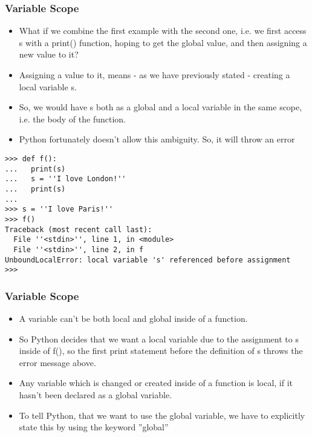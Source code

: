 \begin{frame}[fragile]\frametitle{Variable Scope}

    \begin{itemize}
    \item What if we combine the first example with the second one, i.e. we first access s with a print() function, hoping to get the global value, and then assigning a new value to it? 
    \item Assigning a value to it, means - as we have previously stated - creating a local variable s. 
    \item So, we would have s both as a global and a local variable in the same scope, i.e. the body of the function. 
    \item Python fortunately doesn't allow this ambiguity. So, it will throw an error
    \end{itemize}
\begin{lstlisting}
>>> def f(): 
...   print(s)
...   s = ''I love London!''
...   print(s)
... 
>>> s = ''I love Paris!''
>>> f()
Traceback (most recent call last):
  File ''<stdin>'', line 1, in <module>
  File ''<stdin>'', line 2, in f
UnboundLocalError: local variable 's' referenced before assignment
>>> 
\end{lstlisting}

\end{frame}

\begin{frame}[fragile]\frametitle{Variable Scope}

    \begin{itemize}
    \item A variable can't be both local and global inside of a function. 
    	\item So Python decides that we want a local variable due to the assignment to s inside of f(), so the first print statement before the definition of s throws the error message above.
    	\item Any variable which is changed or created inside of a function is local, if it hasn't been declared as a global variable. 
    	\item To tell Python, that we want to use the global variable, we have to explicitly state this by using the keyword ''global''
    \end{itemize}

\end{frame}

